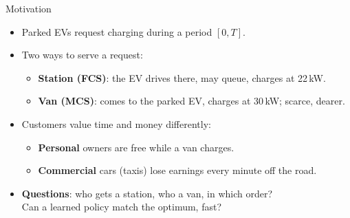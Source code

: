 \documentclass[aspectratio=169,11pt,t]{beamer}
\begin{document}
\begin{frame}{Motivation}
\begin{itemize}
  \item Parked EVs request charging during a period $[0,T]$.
  \item Two ways to serve a request:
  \begin{itemize}
    \item \textbf{Station (FCS)}: the EV drives there, may queue, charges at 22\,kW.
    \item \textbf{Van (MCS)}: comes to the parked EV, charges at 30\,kW; scarce, dearer.
  \end{itemize}
  \item Customers value time and money differently:
  \begin{itemize}
    \item \textbf{Personal} owners are free while a van charges.
    \item \textbf{Commercial} cars (taxis) lose earnings every minute off the road.
  \end{itemize}
  \item \textbf{Questions}: who gets a station, who a van, in which order?\\ Can a learned policy match the optimum, fast?
\end{itemize}
\end{frame}
\end{document}
